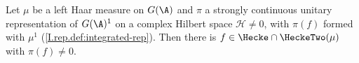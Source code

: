 Let $\mu$ be a left Haar measure on $G(\A)$ and $\pi$ a strongly continuous unitary representation of $G(\A)^1$ on a
complex Hilbert space $\mathcal H\neq0$, with $\pi(f)$ formed with $\mu^1$ (\cref{I.rep.def:integrated-rep}). Then there is
$f\in\Hecke\cap\HeckeTwo(\mu)$ with $\pi(f)\neq0$.
